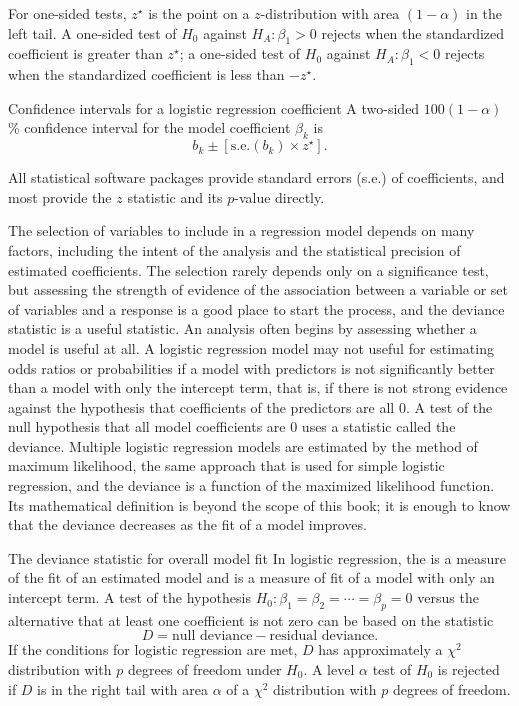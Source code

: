 For one-sided tests, $z^\star$ is the point on a $z$-distribution with area $(1 - \alpha)$ in the left tail. A one-sided test of $H_0$ against $H_A: \beta_1 > 0$ rejects when the standardized coefficient is greater than  $ z^\star$; a one-sided test of $H_0$ against $H_A: \beta_1 < 0$  rejects when the standardized coefficient is less than $-z^\star$.


\begin{onebox}{Confidence intervals for a logistic regression coefficient}
A two-sided $100(1 - \alpha)$\% confidence interval for the model coefficient $\beta_k$ is
\[
  b_k \pm [{\textrm{s.e.}(b_k)} \times z^\star].
\]
\end{onebox}

All statistical software packages provide standard errors (s.e.) of coefficients, and most provide the $z$ statistic and its $p$-value directly.

The selection of variables to include in a regression model depends on many factors, including the intent of the analysis and the statistical precision of estimated coefficients.  The selection rarely depends only on a significance test, but assessing the strength of evidence of the association between a variable or set of variables and a response is a good place to start the process, and the deviance statistic is a useful statistic.  An analysis often begins by assessing whether a model is useful at all.  A logistic regression model may not useful for estimating odds ratios or probabilities if a model with predictors is not significantly better than a model with only the intercept term, that is, if there is not strong evidence against the hypothesis that coefficients of the predictors are all 0.  A test of the null hypothesis that all model coefficients are 0  uses a statistic called the deviance. Multiple logistic regression models are estimated by the method of maximum likelihood, the same approach that is used for simple logistic regression, and the deviance is a function of the maximized likelihood function.  Its mathematical definition is beyond the scope of this book; it is enough to know that the deviance decreases as the fit of a model improves.


\begin{onebox}{The deviance statistic for overall model fit}
  In logistic regression, the  is a measure of the fit of an estimated model and  is a measure of fit of a model with only an intercept term. A test of the hypothesis $H_0:\beta_1 = \beta_2 = \cdots = \beta_p = 0$ versus the alternative that at least one coefficient is not zero can be based on the statistic
  \[
    D =  \text{null deviance} - \text{residual deviance}.
  \]
  If the conditions for logistic regression are met, $D$ has approximately a $\chi^2$ distribution with $p$ degrees of freedom under $H_0$.  A level $\alpha$ test of $H_0$ is rejected if $D$ is in the right tail with area $\alpha$ of a $\chi^2$ distribution with $p$ degrees of freedom.
\end{onebox}

